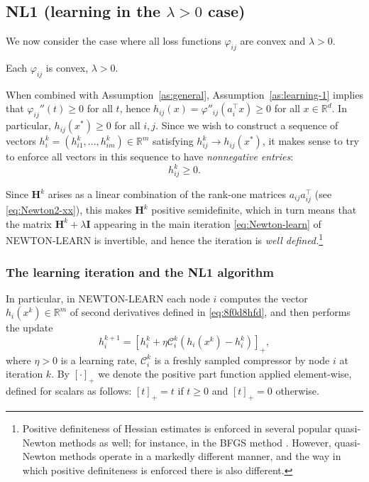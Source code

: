\documentclass[12pt]{article}
\newcommand{\R}{\mathbb{R}}
\newcommand{\newalpha}{h}
\newcommand{\mH}{\mathbf{H}}
\newcommand{\mI}{\mathbf{I}}
\newcommand{\cC}{{\mathcal{C}}}
\begin{document}
\subsection{{\sf NL1} (learning in the $\lambda > 0$ case)} \label{subsec:NL1}

We now consider  the case where all loss functions $\varphi_{ij}$ are convex and $\lambda >0$.
\begin{assumption}\label{as:learning-1}
Each $\varphi_{ij}$ is convex, $\lambda>0$.
\end{assumption}

When combined with  Assumption~\ref{as:general}, Assumption~\ref{as:learning-1} implies that $\varphi_{ij}''(t)\geq 0$ for all $t$, hence $h_{ij}(x) = \varphi''_{ij}(a_i^\top x)\geq 0$ for all $x\in \R^d$. In particular, $h_{ij}(x^*) \geq 0$ for all $i,j$. Since we wish to construct a sequence of vectors $h_i^k = (h_{i1}^k, \dots, h_{im}^k)\in \R^m$ satisfying $h_{ij}^k \to h_{ij}(x^*)$, it makes sense to try to enforce all vectors in this sequence to have {\em nonnegative entries}: $$h_{ij}^k\geq 0.$$

 Since  $\mH^k$ arises as a linear combination of the rank-one matrices $a_{ij}a_{ij}^\top$ (see \eqref{eq:Newton2-xx}), this makes  $\mH^k$ positive semidefinite, which in turn means that the matrix $\mH^k + \lambda \mI$ appearing in the main iteration \eqref{eq:Newton-learn} of {\sf NEWTON-LEARN} is invertible, and hence the iteration is {\em well defined.}\footnote{Positive definiteness of Hessian estimates is enforced in several popular quasi-Newton methods as well; for instance, in the BFGS method \cite{Broyden1967, Fletcher1970, Goldfarb1970, shanno1970conditioning}. However, quasi-Newton methods operate in a markedly different manner, and the way in which positive definiteness is enforced there is also different.} 
 
 
 
\subsubsection{The learning iteration and the {\sf NL1} algorithm}

 In particular, in {\sf NEWTON-LEARN} each node $i$  computes the vector $\newalpha_i(x^k)\in \R^m$  of second derivatives defined in \eqref{eq:8f0d8hfd}, and then performs the update
\begin{equation}\label{eq: big78fd_8h9fd}\boxed{\quad h^{k+1}_i = \left[h^k_i + \eta \cC_i^k(\newalpha_i(x^k) - h^k_i) \right]_+, \quad}\end{equation}
where $\eta>0$ is a learning rate, $\cC_i^k$ is a freshly sampled compressor by node $i$ at iteration $k$. By $[\cdot ]_+$ we denote the positive part function applied element-wise, defined for scalars as follows: $[t ]_+ = t$ if $t\geq 0$ and  $[t ]_+ = 0$ otherwise. 
\end{document}
